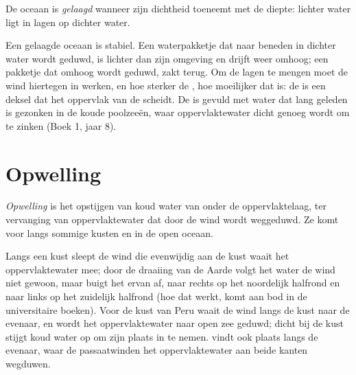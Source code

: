 \begin{definition}[Gelaagdheid]\label{def:g10:layered-ocean:stratification}
De oceaan is \emph{gelaagd} wanneer zijn dichtheid toeneemt
met de diepte: lichter water ligt in lagen op dichter water.
\end{definition}

Een gelaagde oceaan is stabiel. Een waterpakketje dat naar beneden in dichter
water wordt geduwd, is lichter dan zijn omgeving en drijft weer omhoog; een
pakketje dat omhoog wordt geduwd, zakt terug. Om de lagen te mengen moet de wind
hiertegen in werken, en hoe sterker de , hoe moeilijker dat is: de
 is een deksel dat het oppervlak van de  scheidt. De  is gevuld met water dat lang geleden is gezonken in de koude poolzeeën,
waar oppervlaktewater dicht genoeg wordt om te zinken (Boek 1, jaar 8).

\section{Opwelling}

\begin{definition}[Opwelling]\label{def:g10:layered-ocean:upwelling}
\emph{Opwelling} is het opstijgen van koud water van onder de
oppervlaktelaag, ter vervanging van oppervlaktewater dat door de wind wordt
weggeduwd. Ze komt voor langs sommige kusten en in de open oceaan.
\end{definition}

Langs een kust sleept de wind die evenwijdig aan de kust waait het
oppervlaktewater mee; door de draaiing van de Aarde volgt het water de wind niet
gewoon, maar buigt het ervan af, naar rechts op het noordelijk halfrond en naar
links op het zuidelijk halfrond (hoe dat werkt, komt aan bod in de universitaire
boeken). Voor de kust van Peru waait de wind langs de kust naar de evenaar, en
wordt het oppervlaktewater naar open zee geduwd; dicht bij de kust stijgt koud
water op om zijn plaats in te nemen.  vindt ook plaats langs de
evenaar, waar de passaatwinden het oppervlaktewater aan beide kanten wegduwen.

